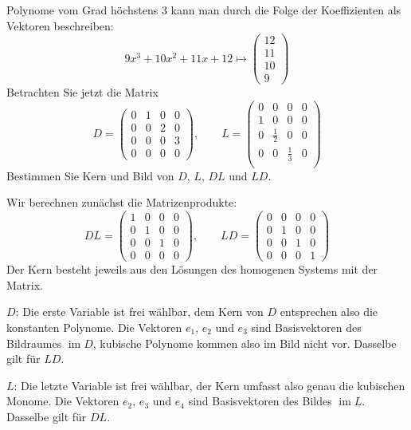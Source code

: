 Polynome vom Grad höchstens 3 kann man durch die Folge der
Koeffizienten als Vektoren beschreiben:
\[
9x^3+10x^2+11x+12\mapsto 
\begin{pmatrix}
12\\11\\10\\9
\end{pmatrix}
\]
Betrachten Sie jetzt die Matrix
\[
D=\begin{pmatrix}
0&1&0&0\\
0&0&2&0\\
0&0&0&3\\
0&0&0&0
\end{pmatrix},
\qquad
L=\begin{pmatrix}
0&0&0&0\\
1&0&0&0\\
0&\frac12&0&0\\
0&0&\frac13&0\\
\end{pmatrix}
\]
Bestimmen Sie Kern und Bild von $D$, $L$, $DL$ und $LD$.


\begin{loesung}
Wir berechnen zunächst die Matrizenprodukte:
\[
DL=\begin{pmatrix}
1&0&0&0\\
0&1&0&0\\
0&0&1&0\\
0&0&0&0
\end{pmatrix},\qquad
LD=\begin{pmatrix}
0&0&0&0\\
0&1&0&0\\
0&0&1&0\\
0&0&0&1
\end{pmatrix}
\]
Der Kern besteht jeweils aus den Lösungen des homogenen Systems mit der
Matrix.

$D$: Die erste Variable ist frei wählbar, dem Kern von $D$ entsprechen also
die konstanten Polynome. Die Vektoren $e_1$, $e_2$ und $e_3$ sind Basisvektoren
des Bildraumes $\operatorname{im}D$, kubische Polynome kommen also im Bild
nicht vor. Dasselbe gilt für $LD$.

$L$: Die letzte Variable ist frei wählbar, der Kern umfasst also
genau die kubischen Monome. Die Vektoren $e_2$, $e_3$ und $e_4$
sind Basisvektoren des Bildes $\operatorname{im}L$. Dasselbe gilt
für $DL$.
\end{loesung}


